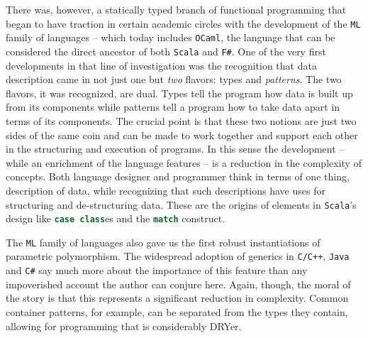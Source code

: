 There was, however, a statically typed branch of functional
programming that began to have traction in certain academic circles
with the development of the \texttt{ML} family of languages -- which
today includes \texttt{OCaml}, the language that can be considered the
direct ancestor of both \texttt{Scala} and \texttt{F\#}. One of the
very first developments in that line of investigation was the
recognition that data description came in not just one but \emph{two}
flavors: types and \emph{patterns}. The two flavors, it was
recognized, are dual. Types tell the program how data is built up
from its components while patterns tell a program how to take data
apart in terms of its components. The crucial point is that these two
notions are just two sides of the same coin and can be made to work
together and support each other in the structuring and execution of
programs. In this sense the development -- while an enrichment of the
language features -- is a reduction in the complexity of
concepts. Both language designer and programmer think in terms of one
thing, description of data, while recognizing that such descriptions
have uses for structuring and de-structuring data. These are the
origins of elements in \texttt{Scala}'s design like
\lstinline[language=Scala]!case class!es and the
\lstinline[language=Scala]!match! construct.

The \texttt{ML} family of languages also gave us the first robust
instantiations of parametric polymorphism. The widespread adoption of
generics in \texttt{C/C++}, \texttt{Java} and \texttt{C\#} say much
more about the importance of this feature than any impoverished
account the author can conjure here. Again, though, the moral of the
story is that this represents a significant reduction in
complexity. Common container patterns, for example, can be separated
from the types they contain, allowing for programming that is
considerably DRYer.

